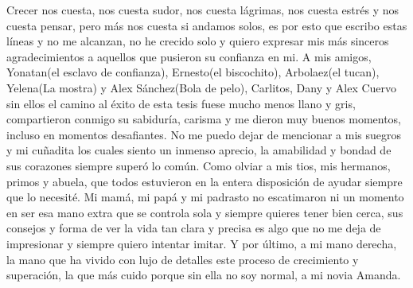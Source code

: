 \begin{acknowledgements}
    
\end{acknowledgements}


Crecer nos cuesta, nos cuesta sudor, nos cuesta lágrimas, nos cuesta estrés y nos cuesta pensar, pero más nos cuesta si andamos solos, es por esto que escribo 
estas líneas y no me alcanzan, no he crecido solo y quiero expresar mis más sinceros agradecimientos a aquellos que pusieron su confianza en mi. A mis amigos, 
Yonatan(el esclavo de confianza), Ernesto(el biscochito), Arbolaez(el tucan), Yelena(La mostra) y Alex Sánchez(Bola de pelo), Carlitos, Dany y Alex Cuervo sin 
ellos el camino al éxito de esta tesis fuese mucho menos llano y gris, compartieron conmigo su sabiduría, carisma y me dieron muy buenos momentos, incluso en 
momentos desafiantes. No me puedo dejar de mencionar a mis suegros y mi cuñadita los cuales siento un inmenso aprecio, la amabilidad y bondad de sus corazones 
siempre superó lo común. Como olviar a mis tios, mis hermanos, primos y abuela, que todos estuvieron en la entera disposición de ayudar siempre que lo necesité. 
Mi mamá, mi papá y mi padrasto no escatimaron ni un momento en ser esa mano extra que se controla sola y siempre quieres tener bien cerca, sus consejos y forma de 
ver la vida tan clara y precisa es algo que no me deja de impresionar y siempre quiero intentar imitar. Y por último, a mi mano derecha, la mano que ha vivido 
con lujo de detalles este proceso de crecimiento y superación, la que más cuido porque sin ella no soy normal, a mi novia Amanda.
